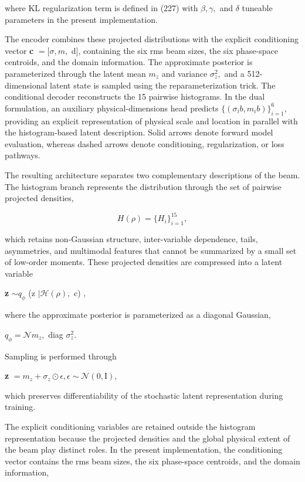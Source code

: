 where KL regularization term is defined in (227) with \(\beta , \gamma ,\) and \(\delta\) tuneable parameters in the present implementation.

The encoder combines these projected distributions with the explicit conditioning vector \textbf{c} \(= [ \sigma , m ,\) d], containing the six rms beam sizes, the six phase-space centroids, and the domain information. The approximate posterior is parameterized through the latent mean \(m_{z}\) and variance \(\sigma_{z}^{2} ,\) and a 512-dimensional latent state is sampled using the reparameterization trick. The conditional decoder reconstructs the 15 pairwise histograms. In the dual formulation, an auxiliary physical-dimensions head predicts \(\{ ( \sigma_{i} b , m_{i} b ) \}_{i = 1}^{6} ,\) providing an explicit representation of physical scale and location in parallel with the histogram-based latent description. Solid arrows denote forward model evaluation, whereas dashed arrows denote conditioning, regularization, or loss pathways.

The resulting architecture separates two complementary descriptions of the beam. The histogram branch represents the distribution through the set of pairwise projected densities,

\[
H(\rho)=\{H_i\}_{i=1}^{15},
\]

which retains non-Gaussian structure, inter-variable dependence, tails, asymmetries, and multimodal features that cannot be summarized by a small set of low-order moments. These projected densities are compressed into a latent variable

\textbf{z} \(\sim q_{\phi}\) (z \(| \mathcal{H} ( \rho ) ,\) c) \(,\)

where the approximate posterior is parameterized as a diagonal Gaussian,

\(q_{\phi} = \mathcal{N} m_{z} ,\) diag \(\sigma_{z}^{2} .\)

Sampling is performed through

\textbf{z} \(= m_{z} + \sigma_{z} \odot \epsilon , \epsilon \sim \mathcal{N} ( 0 , \mathrm{I} ) ,\)

which preserves differentiability of the stochastic latent representation during training.

The explicit conditioning variables are retained outside the histogram representation because the projected densities and the global physical extent of the beam play distinct roles. In the present implementation, the conditioning vector contains the rms beam sizes, the six phase-space centroids, and the domain information,

